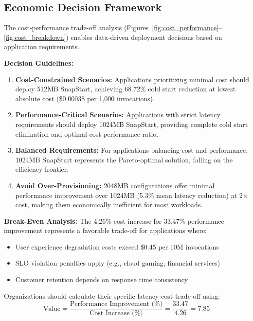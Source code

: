 \documentclass[conference]{IEEEtran}
\begin{document}
\subsection{Economic Decision Framework}

The cost-performance trade-off analysis (Figures~\ref{fig:cost_performance}--\ref{fig:cost_breakdown}) enables data-driven deployment decisions based on application requirements.

\textbf{Decision Guidelines:}

\begin{enumerate}
\item \textbf{Cost-Constrained Scenarios:} Applications prioritizing minimal cost should deploy 512MB SnapStart, achieving 68.72\% cold start reduction at lowest absolute cost (\$0.00038 per 1,000 invocations).

\item \textbf{Performance-Critical Scenarios:} Applications with strict latency requirements should deploy 1024MB SnapStart, providing complete cold start elimination and optimal cost-performance ratio.

\item \textbf{Balanced Requirements:} For applications balancing cost and performance, 1024MB SnapStart represents the Pareto-optimal solution, falling on the efficiency frontier.

\item \textbf{Avoid Over-Provisioning:} 2048MB configurations offer minimal performance improvement over 1024MB (5.3\% mean latency reduction) at 2× cost, making them economically inefficient for most workloads.
\end{enumerate}

\textbf{Break-Even Analysis:}
The 4.26\% cost increase for 33.47\% performance improvement represents a favorable trade-off for applications where:
\begin{itemize}
\item User experience degradation costs exceed \$0.45 per 10M invocations
\item SLO violation penalties apply (e.g., cloud gaming, financial services)
\item Customer retention depends on response time consistency
\end{itemize}

Organizations should calculate their specific latency-cost trade-off using: 
\[
\text{Value} = \frac{\text{Performance Improvement (\%)}}{\text{Cost Increase (\%)}} = \frac{33.47}{4.26} = 7.85
\]
\end{document}

